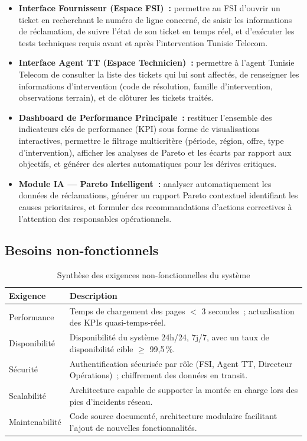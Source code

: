 \documentclass[10pt,a4paper]{report}
\begin{document}
\begin{itemize}[leftmargin=*, itemsep=6pt]
  \item \textbf{Interface Fournisseur (Espace FSI)~:} permettre au FSI d'ouvrir un ticket en recherchant le numéro de ligne concerné, de saisir les informations de réclamation, de suivre l'état de son ticket en temps réel, et d'exécuter les tests techniques requis avant et après l'intervention Tunisie Telecom.

  \item \textbf{Interface Agent TT (Espace Technicien)~:} permettre à l'agent Tunisie Telecom de consulter la liste des tickets qui lui sont affectés, de renseigner les informations d'intervention (code de résolution, famille d'intervention, observations terrain), et de clôturer les tickets traités.

  \item \textbf{Dashboard de Performance Principale~:} restituer l'ensemble des indicateurs clés de performance (KPI) sous forme de visualisations interactives, permettre le filtrage multicritère (période, région, offre, type d'intervention), afficher les analyses de Pareto et les écarts par rapport aux objectifs, et générer des alertes automatiques pour les dérives critiques.

  \item \textbf{Module IA --- Pareto Intelligent~:} analyser automatiquement les données de réclamations, générer un rapport Pareto contextuel identifiant les causes prioritaires, et formuler des recommandations d'actions correctives à l'attention des responsables opérationnels.
\end{itemize}

\subsection{Besoins non-fonctionnels}

\begin{table}[H]
\centering
\caption{Synthèse des exigences non-fonctionnelles du système}
\begin{tabularx}{\textwidth}{L{3.5cm} X}
\toprule
{}
\textbf{\color{ttblue}Exigence} & \textbf{\color{ttblue}Description} \\
\midrule
Performance    & Temps de chargement des pages $<$ 3 secondes~; actualisation des KPIs quasi-temps-réel. \\
Disponibilité  & Disponibilité du système 24h/24, 7j/7, avec un taux de disponibilité cible $\geq$ 99,5\,\%. \\
Sécurité       & Authentification sécurisée par rôle (FSI, Agent TT, Directeur Opérations)~; chiffrement des données en transit. \\
Scalabilité    & Architecture capable de supporter la montée en charge lors des pics d'incidents réseau. \\
Maintenabilité & Code source documenté, architecture modulaire facilitant l'ajout de nouvelles fonctionnalités. \\
\bottomrule
\end{tabularx}
\label{tab:nonfunc}
\end{table}
\end{document}
